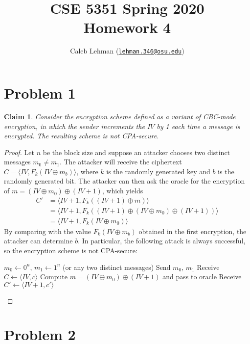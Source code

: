 \documentclass[12pt]{article}
\title{%
CSE 5351 Spring 2020\\
Homework 4
}
\author{%
Caleb Lehman
(\href{mailto:lehman.346@osu.edu}{\texttt{lehman.346@osu.edu}})
}
\date{%
}
\numberwithin{equation}{section}
\theoremstyle{plain}
\newtheorem{claim}{Claim}
\begin{document}
\maketitle

\section*{Problem 1}

\begin{claim}
Consider the encryption scheme defined as a variant of CBC-mode encryption,
in which the sender increments the $IV$ by 1 each time a message is encrypted.
The resulting scheme is not CPA-secure.
\end{claim}
\begin{proof}
Let $n$ be the block size and suppose an attacker chooses two distinct messages $m_0 \neq m_1$.
The attacker will receive the ciphertext $C = \langle IV, F_k(IV \oplus m_b) \rangle$,
where $k$ is the randomly generated key and $b$ is the randomly generated bit.
The attacker can then ask the oracle for the encryption of $m = (IV \oplus m_0) \oplus (IV + 1)$,
which yields
\begin{align*}
    C'
        &= \langle IV + 1, F_k((IV + 1) \oplus m) \rangle\\
        &= \langle IV + 1, F_k((IV + 1) \oplus (IV \oplus m_0) \oplus (IV + 1)) \rangle\\
        &= \langle IV + 1, F_k(IV \oplus m_0) \rangle
\end{align*}
By comparing with the value $F_k(IV \oplus m_b)$ obtained in the first encryption,
the attacker can determine $b$.
In particular, the following attack is always successful,
so the encryption scheme is not CPA-secure:
\begin{algorithm}[H]
\begin{algorithmic}
    \State $m_0 \gets 0^n$, $m_1 \gets 1^n$ (or any two distinct messages)
    \State Send $m_0$, $m_1$
    \State Receive $C \gets \langle IV, c \rangle$
    \State Compute $m = (IV \oplus m_0) \oplus (IV + 1)$ and pass to oracle
    \State Receive $C' \gets \langle IV + 1, c' \rangle$
        \State {}
    \Else
        \State {}
    \EndIf
\EndProcedure
\end{algorithmic}
\end{algorithm}
\end{proof}

\section*{Problem 2}
\end{document}
